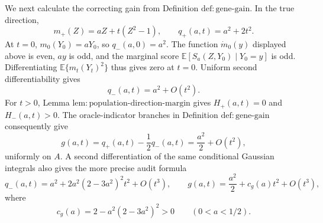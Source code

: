 We next calculate the correcting gain from Definition \(\mathrm{def:gene\text{-}gain}\).  In the true direction,
\[
m_+(Z)=aZ+t(Z^2-1),\qquad q_+(a,t)=a^2+2t^2.
\]
At \(t=0\), \(m_0(Y_0)=aY_0\), so \(q_-(a,0)=a^2\).  The function \(\dot m_0(y)\) displayed above is even, \(a y\) is odd, and the marginal score \(\mathbb E[S_a(Z,Y_0)\mid Y_0=y]\) is odd.  Differentiating \(\mathbb E\{m_t(Y_t)^2\}\) thus gives zero at \(t=0\).  Uniform second differentiability gives
\[
q_-(a,t)=a^2+O(t^2).
\]
For \(t>0\), Lemma \(\mathrm{lem:population\text{-}direction\text{-}margin}\) gives \(H_+(a,t)=0\) and \(H_-(a,t)>0\).  The oracle-indicator branches in Definition \(\mathrm{def:gene\text{-}gain}\) consequently give
\[
g(a,t)=q_+(a,t)-\frac12q_-(a,t)=\frac{a^2}{2}+O(t^2),
\]
uniformly on \(A\).  A second differentiation of the same conditional Gaussian integrals also gives the more precise audit formula
\[
q_-(a,t)=a^2+2a^2(2-3a^2)^2t^2+O(t^3),\qquad
g(a,t)=\frac{a^2}{2}+c_g(a)t^2+O(t^3),
\]
where
\[
c_g(a)=2-a^2(2-3a^2)^2>0\qquad(0<a<1/2).
\]

